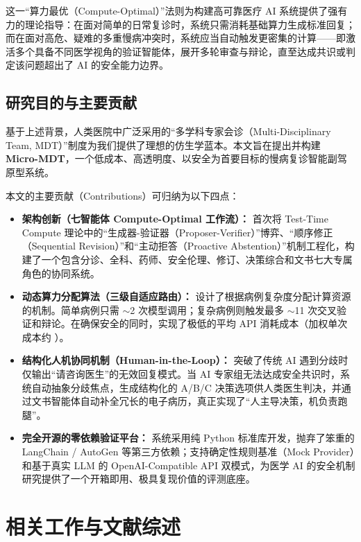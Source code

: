 \documentclass[11pt,a4paper]{ctexart}
\begin{document}
这一“算力最优（Compute-Optimal）”法则为构建高可靠医疗 AI 系统提供了强有力的理论指导：在面对简单的日常复诊时，系统只需消耗基础算力生成标准回复；而在面对高危、疑难的多重慢病冲突时，系统应当自动触发更密集的计算——即激活多个具备不同医学视角的验证智能体，展开多轮审查与辩论，直至达成共识或判定该问题超出了 AI 的安全能力边界。

\subsection{研究目的与主要贡献}

基于上述背景，人类医院中广泛采用的“多学科专家会诊（Multi-Disciplinary Team, MDT）”制度为我们提供了理想的仿生学蓝本。本文旨在提出并构建 \textbf{Micro-MDT}，一个低成本、高透明度、以安全为首要目标的慢病复诊智能副驾原型系统。

本文的主要贡献（Contributions）可归纳为以下四点：
\begin{itemize}
    \item \textbf{架构创新（七智能体 Compute-Optimal 工作流）：} 首次将 Test-Time Compute 理论中的“生成器-验证器（Proposer-Verifier）”博弈、“顺序修正（Sequential Revision）”和“主动拒答（Proactive Abstention）”机制工程化，构建了一个包含分诊、全科、药师、安全伦理、修订、决策综合和文书七大专属角色的协同系统。
    \item \textbf{动态算力分配算法（三级自适应路由）：} 设计了根据病例复杂度分配计算资源的机制。简单病例只需 $\sim$2 次模型调用；复杂病例则触发最多 $\sim$11 次交叉验证和辩论。在确保安全的同时，实现了极低的平均 API 消耗成本（加权单次成本约 ）。
    \item \textbf{结构化人机协同机制（Human-in-the-Loop）：} 突破了传统 AI 遇到分歧时仅输出“请咨询医生”的无效回复模式。当 AI 专家组无法达成安全共识时，系统自动抽象分歧焦点，生成结构化的 A/B/C 决策选项供人类医生判决，并通过文书智能体自动补全冗长的电子病历，真正实现了“人主导决策，机负责跑腿”。
    \item \textbf{完全开源的零依赖验证平台：} 系统采用纯 Python 标准库开发，抛弃了笨重的 LangChain / AutoGen 等第三方依赖；支持确定性规则基准（Mock Provider）和基于真实 LLM 的 OpenAI-Compatible API 双模式，为医学 AI 的安全机制研究提供了一个开箱即用、极具复现价值的评测底座。
\end{itemize}

\newpage
\section{相关工作与文献综述}
\end{document}
